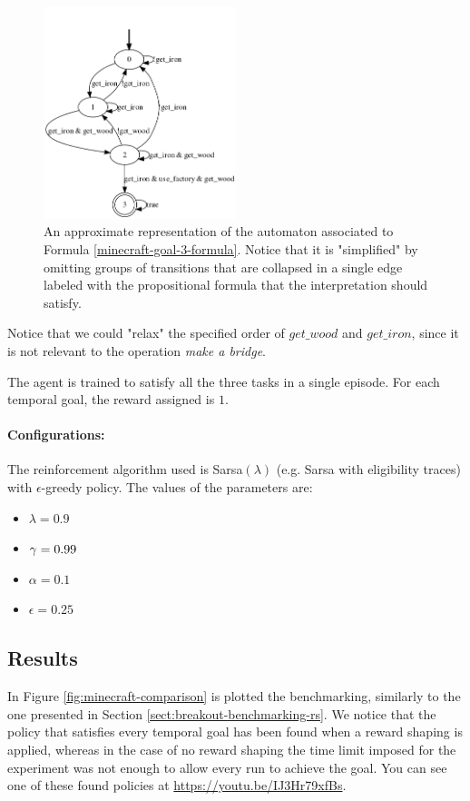 \begin{figure}[h]
	\centering
	\includegraphics[width=0.5\textwidth]{images/minecraft_goal.png}
	\caption{An approximate representation of the automaton associated to Formula \ref{minecraft-goal-3-formula}. Notice that it is "simplified" by omitting groups of transitions that are collapsed in a single edge labeled with the propositional formula that the interpretation should satisfy.}
	\label{fig:minecraft-goal-3-automaton}
\end{figure}

Notice that we could "relax" the specified order of $get\_wood$ and $get\_iron$, since it is not relevant to the operation \emph{make a bridge}.

The agent is trained to satisfy all the three tasks in a single episode. For each temporal goal, the reward assigned is $1$.

\paragraph{Configurations:}
The reinforcement algorithm used is Sarsa$(\lambda)$ (e.g. Sarsa with eligibility traces) with $\epsilon$-greedy policy. The values of the parameters are:
	\begin{itemize}
		\item $\lambda = 0.9$
		\item $\gamma=0.99$	
		\item $\alpha=0.1$
		\item $\epsilon= 0.25$
	\end{itemize}

\subsection{Results}
In Figure \ref{fig:minecraft-comparison} is plotted the benchmarking, similarly to the one presented in Section \ref{sect:breakout-benchmarking-rs}. We notice that the policy that satisfies every temporal goal has been found when a reward shaping is applied, whereas in the case of no reward shaping the time limit imposed for the experiment was not enough to allow every run to achieve the goal. You can see one of these found policies at \url{https://youtu.be/IJ3Hr79xfBs}.

